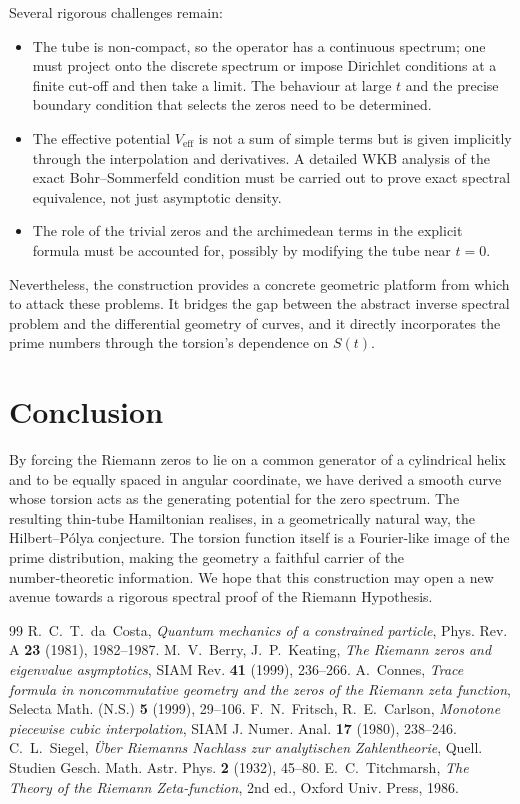 \documentclass[12pt,a4paper]{article}
\begin{document}
Several rigorous challenges remain:
\begin{itemize}
  \item The tube is non‑compact, so the operator has a continuous spectrum; one must project onto the discrete spectrum or impose Dirichlet conditions at a finite cut‑off and then take a limit. The behaviour at large $t$ and the precise boundary condition that selects the zeros need to be determined.
  \item The effective potential $V_{\mathrm{eff}}$ is not a sum of simple terms but is given implicitly through the interpolation and derivatives. A detailed WKB analysis of the exact Bohr–Sommerfeld condition must be carried out to prove exact spectral equivalence, not just asymptotic density.
  \item The role of the trivial zeros and the archimedean terms in the explicit formula must be accounted for, possibly by modifying the tube near $t=0$.
\end{itemize}
Nevertheless, the construction provides a concrete geometric platform from which to attack these problems. It bridges the gap between the abstract inverse spectral problem and the differential geometry of curves, and it directly incorporates the prime numbers through the torsion’s dependence on $S(t)$.

\section{Conclusion}
By forcing the Riemann zeros to lie on a common generator of a cylindrical helix and to be equally spaced in angular coordinate, we have derived a smooth curve whose torsion acts as the generating potential for the zero spectrum. The resulting thin‑tube Hamiltonian realises, in a geometrically natural way, the Hilbert–P\'olya conjecture. The torsion function itself is a Fourier-like image of the prime distribution, making the geometry a faithful carrier of the number‑theoretic information. We hope that this construction may open a new avenue towards a rigorous spectral proof of the Riemann Hypothesis.

\begin{thebibliography}{99}
R.~C.~T.~da~Costa,
\emph{Quantum mechanics of a constrained particle},
Phys. Rev. A \textbf{23} (1981), 1982--1987.
M.~V.~Berry, J.~P.~Keating,
\emph{The Riemann zeros and eigenvalue asymptotics},
SIAM Rev. \textbf{41} (1999), 236--266.
A.~Connes,
\emph{Trace formula in noncommutative geometry and the zeros of the Riemann zeta function},
Selecta Math. (N.S.) \textbf{5} (1999), 29--106.
F.~N.~Fritsch, R.~E.~Carlson,
\emph{Monotone piecewise cubic interpolation},
SIAM J. Numer. Anal. \textbf{17} (1980), 238--246.
C.~L.~Siegel,
\emph{\"Uber Riemanns Nachlass zur analytischen Zahlentheorie},
Quell. Studien Gesch. Math. Astr. Phys. \textbf{2} (1932), 45--80.
E.~C.~Titchmarsh,
\emph{The Theory of the Riemann Zeta-function},
2nd ed., Oxford Univ. Press, 1986.
\end{thebibliography}
\end{document}
